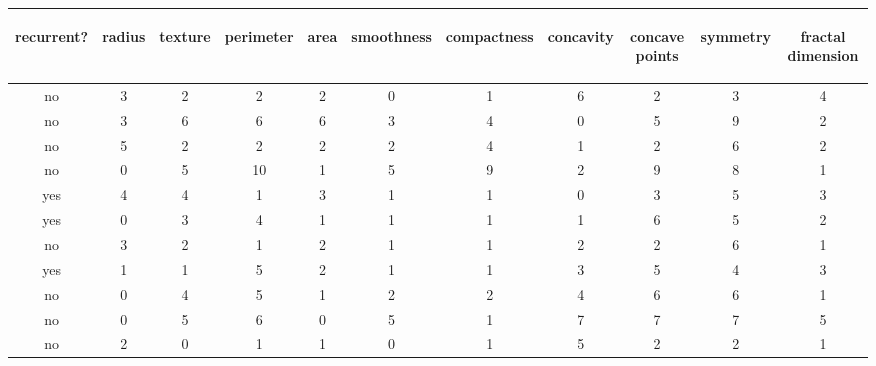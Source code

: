 \vspace{0.2cm}
\begin{tabular}{ccccccccccc}\rule{0pt}{15mm}%
\begin{rotate}{45}recurrent?\end{rotate} & \begin{rotate}{45}radius\end{rotate} & \begin{rotate}{45}texture\end{rotate} &
\begin{rotate}{45}perimeter\end{rotate} & \begin{rotate}{45}area\end{rotate} & \begin{rotate}{45}smoothness\end{rotate} & \begin{rotate}{45}compactness\end{rotate} &
 \begin{rotate}{45}concavity\end{rotate} & \begin{rotate}{45}concave points\end{rotate} & \begin{rotate}{45}symmetry\end{rotate} &
  \begin{rotate}{45}fractal dimension\end{rotate}\\\hline\hline
no &  3 & 2 & 2 & 2 & 0 & 1 & 6 & 2 & 3 & 4 \\
no &  3 & 6 & 6 & 6 & 3 & 4 & 0 & 5 & 9 & 2 \\
no &  5 & 2 & 2 & 2 & 2 & 4 & 1 & 2 & 6 & 2 \\
no &  0 & 5 & 10 & 1 & 5 & 9 & 2 & 9 & 8 & 1 \\
yes &  4 & 4 & 1 & 3 & 1 & 1 & 0 & 3 & 5 & 3 \\
yes &  0 & 3 & 4 & 1 & 1 & 1 & 1 & 6 & 5 & 2 \\
no &  3 & 2 & 1 & 2 & 1 & 1 & 2 & 2 & 6 & 1 \\
yes &  1 & 1 & 5 & 2 & 1 & 1 & 3 & 5 & 4 & 3 \\
no &  0 & 4 & 5 & 1 & 2 & 2 & 4 & 6 & 6 & 1 \\
no &  0 & 5 & 6 & 0 & 5 & 1 & 7 & 7 & 7 & 5 \\
no &  2 & 0 & 1 & 1 & 0 & 1 & 5 & 2 & 2 & 1 \\\hline\hline
\end{tabular}
